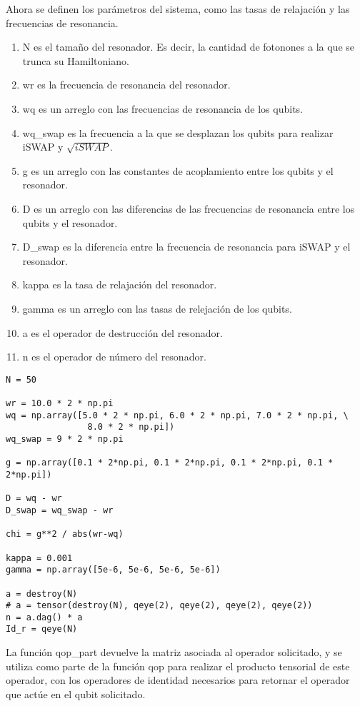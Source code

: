 Ahora se definen los parámetros del sistema, como las tasas de relajación y las frecuencias de resonancia.

\begin{enumerate}
    \item N es el tamaño del resonador. Es decir, la cantidad de fotonones a la que se trunca su Hamiltoniano.
    \item wr es la frecuencia de resonancia del resonador.
    \item wq es un arreglo con las frecuencias de resonancia de los qubits.
    \item wq\_swap es la frecuencia a la que se desplazan los qubits para realizar iSWAP y $\sqrt{iSWAP}$.
    \item g es un arreglo con las constantes de acoplamiento entre los qubits y el resonador.
    \item D es un arreglo con las diferencias de las frecuencias de resonancia entre los qubits y el resonador.
    \item D\_swap es la diferencia entre la frecuencia de resonancia para iSWAP y el resonador.
    \item kappa es la tasa de relajación del resonador.
    \item gamma es un arreglo con las tasas de relejación de los qubits.
    \item a es el operador de destrucción del resonador.
    \item n es el operador de número del resonador.
\end{enumerate}

\begin{verbatim}
N = 50

wr = 10.0 * 2 * np.pi
wq = np.array([5.0 * 2 * np.pi, 6.0 * 2 * np.pi, 7.0 * 2 * np.pi, \
                8.0 * 2 * np.pi])
wq_swap = 9 * 2 * np.pi

g = np.array([0.1 * 2*np.pi, 0.1 * 2*np.pi, 0.1 * 2*np.pi, 0.1 * 2*np.pi])

D = wq - wr
D_swap = wq_swap - wr

chi = g**2 / abs(wr-wq)

kappa = 0.001
gamma = np.array([5e-6, 5e-6, 5e-6, 5e-6])

a = destroy(N)
# a = tensor(destroy(N), qeye(2), qeye(2), qeye(2), qeye(2))
n = a.dag() * a
Id_r = qeye(N)
\end{verbatim}

La función qop\_part devuelve la matriz asociada al operador solicitado, y se utiliza como parte de la función qop para realizar el producto tensorial de este operador, con los operadores de identidad necesarios para retornar el operador que actúe en el qubit solicitado.

